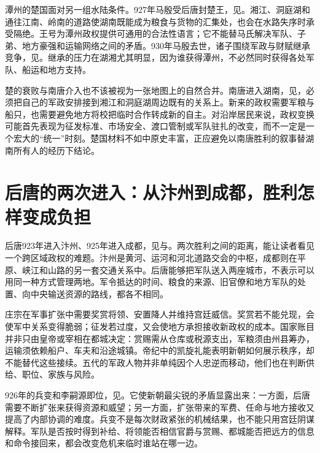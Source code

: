 潭州的楚国面对另一组水陆条件。927年马殷受后唐封楚王，见。湘江、洞庭湖和通往江南、岭南的道路使湖南既能成为粮食与货物的汇集处，也会在水路失序时承受隔绝。王号为潭州政权提供可通用的合法性语言；它不能替马氏解决军队、子弟、地方豪强和运输网络之间的矛盾。930年马殷去世，诸子围绕军政与财赋继承竞争，见。继承的压力在湖湘尤其明显，因为谁获得潭州，不必然同时获得各处军队、船运和地方支持。

楚的衰败与南唐介入也不该被视为一张地图上的自然合并。南唐进入湖南，见，必须把自己的军政安排接到湘江和洞庭湖周边既有的关系上。新来的政权需要军粮与船只，也需要避免地方将校把临时合作转成新的自主。对沿岸居民来说，政权变换可能首先表现为征发标准、市场安全、渡口管制或军队驻扎的改变，而不一定是一个宏大的“统一”时刻。楚国材料不如中原史丰富，正应避免以南唐胜利的叙事替湖南所有人的经历下结论。

\section{后唐的两次进入：从汴州到成都，胜利怎样变成负担}

后唐923年进入汴州、925年进入成都，见与。两次胜利之间的距离，能让读者看见一个跨区域政权的难题。汴州是黄河、运河和河北道路交会的中枢，成都则在平原、峡江和山路的另一套交通关系中。后唐能够把军队送入两座城市，不表示可以用同一种方式管理两地。军令抵达的时间、粮食的来源、旧官僚和地方军队的处置、向中央输送资源的路线，都各不相同。

庄宗在军事扩张中需要奖赏将领、安置降人并维持宫廷威信。奖赏若不能兑现，会使军中关系变得脆弱；征发若过度，又会使地方承担接收新政权的成本。国家账目并非只由皇帝或宰相在都城决定：赏赐需从仓库或税源支出，军粮须由州县筹办，运输须依赖船户、车夫和沿途城镇。帝纪中的凯旋礼能表明新朝如何展示秩序，却不能替代这些接续。五代的军政人物并非单纯因个人忠逆而移动，他们也在判断供给、职位、家族与风险。

926年的兵变和李嗣源即位，见。它使新朝最尖锐的矛盾显露出来：一方面，后唐需要不断扩张来获得资源和威望；另一方面，扩张带来的军费、任命与地方接收又提高了内部协调的难度。兵变不是每次财政紧张的机械结果，也不能只用宫廷阴谋解释。军队是否按时得到补给、将领能否相信官爵与赏赐、都城能否把远方的信息和命令接回来，都会改变危机来临时谁站在哪一边。


